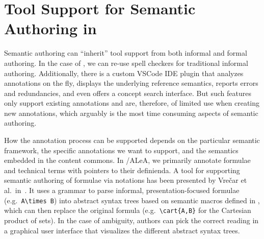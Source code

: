 \documentclass{llncs}
\newcommand\ALeA{\textsf{ALeA}\xspace}
\begin{document}


\section{Tool Support for Semantic Authoring in \sTeX}\label{sec:tools}
Semantic authoring can ``inherit'' tool support from both informal and formal authoring.
In the case of \sTeX, we can re-use spell checkers for traditional informal authoring.
Additionally, there is a custom VSCode IDE plugin \cite{sTeX-IDE:git} that analyzes
annotations on the fly, displays the underlying reference semantics, reports errors and
redundancies, and even offers a concept search interface.  But such features only support
existing annotations and are, therefore, of limited use when creating new annotations,
which arguably is the most time consuming aspects of semantic authoring.  

How the annotation process can be supported depends on the particular semantic framework,
the specific annotations we want to support, and the semantics embedded in the content
commons.  In \sTeX/\ALeA, we primarily annotate formulae and technical terms with pointers
to their definienda.  A tool for supporting semantic authoring of formulae via notations
has been presented by Vre{\v{c}}ar et al.\ in~\cite{VreWelKam:tsmmdui24}.  It uses a
grammar to parse informal, presentation-focused formulae (e.g.\
\lstinline[keywordstyle={}]|A\times B|) into abstract syntax trees based on semantic
macros defined in \sTeX, which can then replace the original formula (e.g.\
\lstinline|\cart{A,B}| for the Cartesian product of sets).  In the case of ambiguity,
authors can pick the correct reading in a graphical user interface that visualizes the
different abstract syntax trees.
\end{document}
